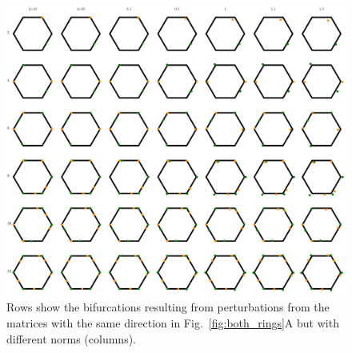 \documentclass{article} %
\newcounter{ct}
\theoremstyle{definition}
\theoremstyle{remark}
\begin{document}
\begin{figure}[tbhp]
     \centering
    \includegraphics[width=\textwidth]{noorman_ring_N6_pert_allfxdpnts_allnorms}
       \caption{Rows show the bifurcations resulting from perturbations from the matrices with the same direction in Fig.~\ref{fig:both_rings}A but with different norms (columns). }
         \label{fig:noorman_ring_allfxdpnts_allnorm}
\end{figure}



%
\end{document}
